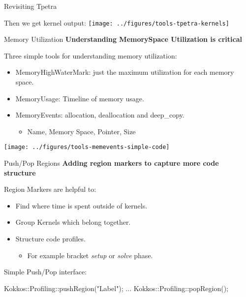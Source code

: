 
\begin{frame}[fragile]{Revisiting Tpetra}


Then we get kernel output:
\texttt{[image: ../figures/tools-tpetra-kernels]}
\end{frame}


\begin{frame}[fragile]{Memory Utilization}
\textbf{Understanding MemorySpace Utilization is critical}

\vspace{10pt}
Three simple tools for understanding memory utilization:
\begin{itemize}
  \item MemoryHighWaterMark: just the maximum utilization for each memory space.
  \item MemoryUsage: Timeline of memory usage.
  \item MemoryEvents: allocation, deallocation and deep\_copy.
  \begin{itemize}
    \item Name, Memory Space, Pointer, Size
  \end{itemize}
\end{itemize}

\texttt{[image: ../figures/tools-memevents-simple-code]}
\end{frame}


\begin{frame}[fragile]{Push/Pop Regions}
	\textbf{Adding region markers to capture more code structure}

Region Markers are helpful to:
\begin{itemize}
  \item Find where time is spent outside of kernels.
  \item Group Kernels which belong together.
  \item Structure code profiles.
  \begin{itemize}
     \item For example bracket \textit{setup} or \textit{solve} phase. 
  \end{itemize}
\end{itemize}

\pause
\vspace{10pt}
Simple Push/Pop interface:
\begin{code}
  Kokkos::Profiling::pushRegion("Label");
  ...
  Kokkos::Profiling::popRegion();
\end{code}
\end{frame}

